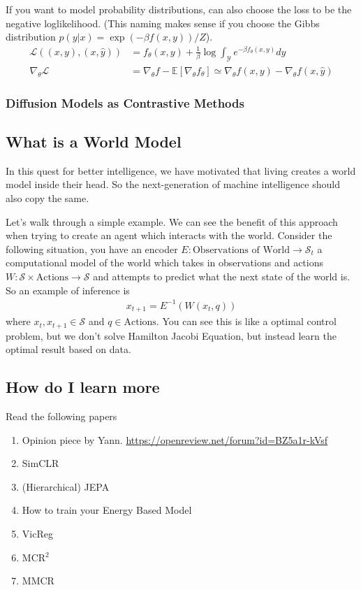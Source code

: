 If you want to model probability distributions, can also choose the loss to be the negative loglikelihood. (This naming makes sense if you choose the Gibbs distribution $p(y|x) = \exp(- \beta f(x,y))/Z$).
\begin{align}
	\mathcal L((x,y), ( x, \hat y)) & = f_\theta(x,y) + \frac{1}{\beta} \log \int_{\mathcal Y} e^{-\beta f_\theta(x,y)} dy\\
	\nabla_{\theta}\mathcal L & =  \nabla_\theta f - \mathbb E[\nabla_\theta f_\theta] \simeq \nabla_\theta f(x,y) - \nabla_\theta f(x,\hat y)
\end{align}

\subsubsection{Diffusion Models as Contrastive Methods}


 
\subsection{What is a World Model}
In this quest for better intelligence, we have motivated that living creates a world model inside their head. So the next-generation of machine intelligence should also copy the same. 

Let's walk through a simple example. We can see the benefit of this approach when trying to create an agent which interacts with the world. Consider the following situation, you have an encoder $E : \text{Observations of World} \to \mathcal S_t$ a computational model of the world which takes in observations and actions $W: \mathcal S \times \text{Actions} \to \mathcal S$ and attempts to predict what the next state of the world is.  So an example of inference is
\begin{align}
	x_{t+1} = E^{-1}(W(x_t,  q))
\end{align}
where $x_t, x_{t+1} \in \mathcal S$ and $q \in \text{Actions}$. You can see this is like a optimal control problem, but we don't solve Hamilton Jacobi Equation, but instead learn the optimal result based on data.

\subsection{How do I learn more}
Read the following papers
\begin{enumerate}
	\item Opinion piece by Yann. \url{https://openreview.net/forum?id=BZ5a1r-kVsf}
	\item SimCLR
	\item (Hierarchical) JEPA
	\item How to train your Energy Based Model
	\item VicReg
	\item MCR$^2$
	\item MMCR
\end{enumerate}

